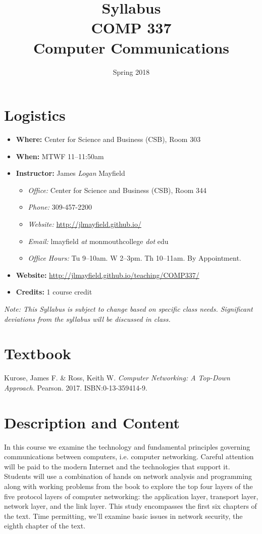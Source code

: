 \documentclass[10pt]{article}
\title{Syllabus \\ COMP 337 \\ Computer Communications}
\author{  }
\date{Spring 2018}
\begin{document}
\maketitle

\section{Logistics}
\begin{itemize}
\item \textbf{Where: }Center for Science and Business (CSB), Room 303
\item \textbf{When: } MTWF 11--11:50am
\item \textbf{Instructor: } James \textit{Logan} Mayfield
\begin{itemize}
\item \textit{Office: } Center for Science and Business (CSB), Room 344
\item \textit{Phone: } 309-457-2200 %
\item \textit{Website: } \url{http://jlmayfield.github.io/}
\item \textit{Email: } lmayfield \textit{at} monmouthcollege \textit{dot} edu
\item \textit{Office Hours: }  Tu 9--10am. W 2--3pm. Th 10--11am. By Appointment.
\end{itemize}
\item \textbf{Website: } \url{http://jlmayfield.github.io/teaching/COMP337/}
\item \textbf{Credits: } 1 course credit
\end{itemize}
\emph{Note: This Syllabus is subject to change based on specific class needs. Significant deviations from the syllabus will be discussed in class.}

\section{Textbook}

\noindent
Kurose, James F. \& Ross, Keith W. \textit{Computer Networking: A Top-Down Approach.} Pearson. 2017. ISBN:0-13-359414-9. %


\section{Description and Content}

In this course we examine the technology and fundamental principles governing communications between computers, i.e. computer networking. Careful attention will be paid to the modern Internet and the technologies that support it.  Students will use a combination of hands on network analysis and programming along with working problems from the book to explore the top four layers of the five protocol layers of computer networking: the application layer, transport layer, network layer, and the link layer. This study encompasses the first six chapters of the text. Time permitting, we'll examine basic issues in network security, the eighth chapter of the text.
\end{document}
